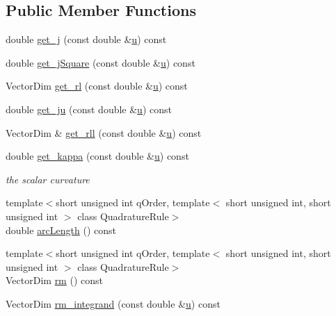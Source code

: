 \subsection*{Public Member Functions}
\begin{DoxyCompactItemize}
\item 
double \hyperlink{classmodel_1_1_parametric_curve_a4c4b017c72eb4e30f2e042d6d834033a}{get\+\_\+j} (const double \&\hyperlink{angle_axis_8m_a52688d77a393e5a594a1e82658e634b6}{u}) const 
\item 
double \hyperlink{classmodel_1_1_parametric_curve_a0a3f30110a4ade5fbf25004a6da47923}{get\+\_\+j\+Square} (const double \&\hyperlink{angle_axis_8m_a52688d77a393e5a594a1e82658e634b6}{u}) const 
\item 
Vector\+Dim \hyperlink{classmodel_1_1_parametric_curve_a29f75530108c833f8f96e939a71ad665}{get\+\_\+rl} (const double \&\hyperlink{angle_axis_8m_a52688d77a393e5a594a1e82658e634b6}{u}) const 
\item 
double \hyperlink{classmodel_1_1_parametric_curve_aa9074bd2cf2c9698db2515e2471de1f0}{get\+\_\+ju} (const double \&\hyperlink{angle_axis_8m_a52688d77a393e5a594a1e82658e634b6}{u}) const 
\item 
Vector\+Dim \& \hyperlink{classmodel_1_1_parametric_curve_a581ac03e003eaef4fa97021ecff044a2}{get\+\_\+rll} (const double \&\hyperlink{angle_axis_8m_a52688d77a393e5a594a1e82658e634b6}{u}) const 
\item 
double \hyperlink{classmodel_1_1_parametric_curve_ad1284258b9b2e6befcd0a64adf272fcc}{get\+\_\+kappa} (const double \&\hyperlink{angle_axis_8m_a52688d77a393e5a594a1e82658e634b6}{u}) const 
\begin{DoxyCompactList}\small\item\em the scalar curvature \end{DoxyCompactList}\item 
{\footnotesize template$<$short unsigned int q\+Order, template$<$ short unsigned int, short unsigned int $>$ class Quadrature\+Rule$>$ }\\double \hyperlink{classmodel_1_1_parametric_curve_ac48cd5a6d5b8acc2109525b3e3bd7e98}{arc\+Length} () const 
\item 
{\footnotesize template$<$short unsigned int q\+Order, template$<$ short unsigned int, short unsigned int $>$ class Quadrature\+Rule$>$ }\\Vector\+Dim \hyperlink{classmodel_1_1_parametric_curve_a5130e937d64cc1d375c8a406ac58e3d4}{rm} () const 
\item 
Vector\+Dim \hyperlink{classmodel_1_1_parametric_curve_aa656816673555770d57069fef8c7dd06}{rm\+\_\+integrand} (const double \&\hyperlink{angle_axis_8m_a52688d77a393e5a594a1e82658e634b6}{u}) const 
\end{DoxyCompactItemize}


